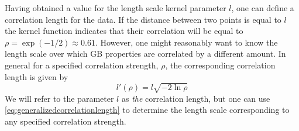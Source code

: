 \documentclass[final,twocolumn,12pt]{elsarticle}
\begin{document}
    Having obtained a value for the length scale kernel parameter $l$, one can define a correlation length for the data. If the distance between two points is equal to $l$ the kernel function indicates that their correlation will be equal to $\rho = \exp{\left(-1/2\right)} \approx 0.61$. However, one might reasonably want to know the length scale over which GB properties are correlated by a different amount. In general for a specified correlation strength, $\rho$, the corresponding correlation length is given by
    \begin{equation}
        \label{eq:generalizedcorrelationlength}
        l'\!\left(\rho\right) = l \sqrt{-2 \ln{\rho}}
    \end{equation}
    We will refer to the parameter $l$ as \emph{the} correlation length, but one can use \cref{eq:generalizedcorrelationlength} to determine the length scale corresponding to any specified correlation strength. %
	
\end{document}
